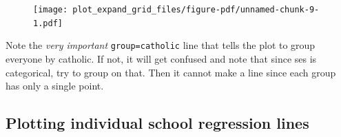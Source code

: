 \documentclass[
  letterpaper,
  DIV=11,
  numbers=noendperiod]{scrreprt}
\newenvironment{Shaded}{\begin{snugshade}}{\end{snugshade}}
\newcommand{\AttributeTok}[1]{\textcolor[rgb]{0.49,0.56,0.16}{#1}}
\newcommand{\DecValTok}[1]{\textcolor[rgb]{0.25,0.63,0.44}{#1}}
\newcommand{\FunctionTok}[1]{\textcolor[rgb]{0.02,0.16,0.49}{#1}}
\newcommand{\NormalTok}[1]{\textcolor[rgb]{0.00,0.44,0.13}{#1}}
\newcommand{\OtherTok}[1]{\textcolor[rgb]{0.00,0.44,0.13}{#1}}
\newcommand{\SpecialCharTok}[1]{\textcolor[rgb]{0.25,0.44,0.63}{#1}}
\newcommand{\StringTok}[1]{\textcolor[rgb]{0.25,0.44,0.63}{#1}}
\begin{document}
\begin{Shaded}
\end{Shaded}

\begin{figure}[H]

{\centering \texttt{[image: plot\_expand\_grid\_files/figure-pdf/unnamed-chunk-9-1.pdf]}

}

\end{figure}

Note the \emph{very important} \texttt{group=catholic} line that tells
the plot to group everyone by catholic. If not, it will get confused and
note that since ses is categorical, try to group on that. Then it cannot
make a line since each group has only a single point.

\hypertarget{plotting-individual-school-regression-lines}{%
\subsection{Plotting individual school regression
lines}\label{plotting-individual-school-regression-lines}}
\end{document}
